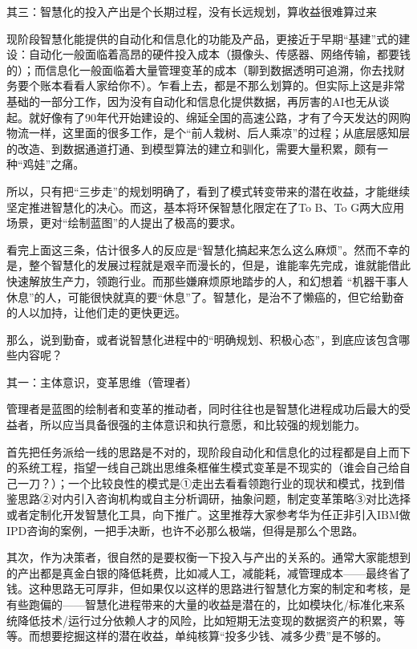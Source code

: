 \documentclass[]{book}
\begin{document}
其三：智慧化的投入产出是个长期过程，没有长远规划，算收益很难算过来

现阶段智慧化能提供的自动化和信息化的功能及产品，更接近于早期``基建''式的建设：自动化一般面临着高昂的硬件投入成本（摄像头、传感器、网络传输，都要钱的）；而信息化一般面临着大量管理变革的成本（聊到数据透明可追溯，你去找财务要个账本看看人家给你不）。乍看上去，都是不那么划算的。但实际上这是非常基础的一部分工作，因为没有自动化和信息化提供数据，再厉害的AI也无从谈起。就好像有了90年代开始建设的、绵延全国的高速公路，才有了今天发达的网购物流一样，这里面的很多工作，是个``前人栽树、后人乘凉''的过程；从底层感知层的改造、到数据通道打通、到模型算法的建立和驯化，需要大量积累，颇有一种``鸡娃''之痛。

所以，只有把``三步走''的规划明确了，看到了模式转变带来的潜在收益，才能继续坚定推进智慧化的决心。而这，基本将环保智慧化限定在了To B、To G两大应用场景，更对``绘制蓝图''的人提出了极高的要求。

看完上面这三条，估计很多人的反应是``智慧化搞起来怎么这么麻烦''。然而不幸的是，整个智慧化的发展过程就是艰辛而漫长的，但是，谁能率先完成，谁就能借此快速解放生产力，领跑行业。而那些嫌麻烦原地踏步的人，和幻想着 ``机器干事人休息''的人，可能很快就真的要``休息''了。智慧化，是治不了懒癌的，但它给勤奋的人以加持，让他们走的更快更远。

那么，说到勤奋，或者说智慧化进程中的``明确规划、积极心态''，到底应该包含哪些内容呢？

其一：主体意识，变革思维（管理者）

管理者是蓝图的绘制者和变革的推动者，同时往往也是智慧化进程成功后最大的受益者，所以应当具备很强的主体意识和执行意愿，和比较强的规划能力。

首先把任务派给一线的思路是不对的，现阶段自动化和信息化的过程都是自上而下的系统工程，指望一线自己跳出思维条框催生模式变革是不现实的（谁会自己给自己一刀？）；一个比较良性的模式是①走出去看看领跑行业的现状和模式，找到借鉴思路②对内引入咨询机构或自主分析调研，抽象问题，制定变革策略③对比选择或者定制化开发智慧化工具，向下推广。这里推荐大家参考华为任正非引入IBM做IPD咨询的案例，一把手决断，也许不必那么极端，但得是那么个思路。

其次，作为决策者，很自然的是要权衡一下投入与产出的关系的。通常大家能想到的产出都是真金白银的降低耗费，比如减人工，减能耗，减管理成本------最终省了钱。这种思路无可厚非，但如果仅以这样的思路进行智慧化方案的制定和考核，是有些跑偏的------智慧化进程带来的大量的收益是潜在的，比如模块化/标准化来系统降低技术/运行过分依赖人才的风险，比如短期无法变现的数据资产的积累，等等。而想要挖掘这样的潜在收益，单纯核算``投多少钱、减多少费''是不够的。
\end{document}
